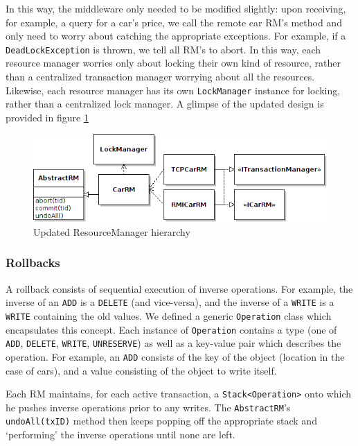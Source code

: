 \documentclass[a4paper]{article}
\begin{document}
In this way, the middleware only needed to be modified slightly: upon receiving, for example, a query for a car's price, we call the remote car RM's method and only need to worry about catching the appropriate exceptions. For example, if a 
\texttt{DeadLockException} is thrown, we tell all RM's to abort. In this way, each resource manager worries only about locking their own kind of resource, rather than a centralized transaction manager worrying about all the resources.
Likewise, each resource manager has its own \texttt{LockManager} instance for locking, rather than a centralized lock manager. A glimpse of the updated design is provided in figure \ref{txncarrm}
\begin{figure}[h!]
  \centering
	\includegraphics[scale=0.6]{txncarrm.png}
  \caption{Updated ResourceManager hierarchy}
  \label{txncarrm}
\end{figure}
\subsubsection{Rollbacks}
\label{rollbacks}

A rollback consists of sequential execution of inverse operations. For example, the inverse of an \texttt{ADD} is a \texttt{DELETE} (and vice-versa), and the inverse of a \texttt{WRITE} is a \texttt{WRITE} containing the old values. 
We defined a generic \texttt{Operation} class which encapsulates this concept. Each instance of \texttt{Operation} contains a type (one of \texttt{ADD}, \texttt{DELETE}, \texttt{WRITE}, \texttt{UNRESERVE}) as well as a key-value pair
which describes the operation. For example, an \texttt{ADD} consists of the key of the object (location in the case of cars), and a value consisting of the object to write itself. 

Each RM maintains, for each active transaction, a \texttt{Stack<Operation>} onto which he pushes inverse operations prior to any writes. The \texttt{AbstractRM}'s \texttt{undoAll(txID)} method then keeps popping off the appropriate stack
and `performing' the inverse operations until none are left. 
\end{document}
